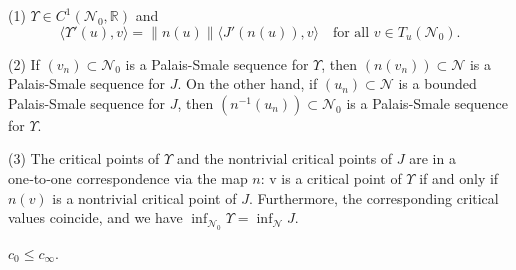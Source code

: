 \documentclass[reqno]{amsart}
\begin{document}
\begin{lemma}\label{L3.10} 
(1) $\Upsilon\in C^{1}(\mathcal{N}_0,\mathbb{R})$ and
$$
\langle \Upsilon'(u),v \rangle =\|n(u)\| \langle J'(n(u)),v \rangle \quad \text{for all } v\in T_{u}(\mathcal{N}_0).
$$

(2) If $(v_{n})\subset\mathcal{N}_0$ is a Palais-Smale sequence for $\Upsilon$,
 then $(n(v_{n}))\subset\mathcal{N}$ is a Palais-Smale sequence for $J$. 
On the other hand, if $(u_{n})\subset\mathcal{N}$ is a bounded Palais-Smale sequence for $J$, 
then $(n^{-1}(u_{n}))\subset\mathcal{N}_0$ is a Palais-Smale sequence for $\Upsilon$.

(3) The critical points of $\Upsilon$ and the nontrivial critical points of $J$ are in a one‑to‑one 
correspondence via the map $n$: v is a critical point of $\Upsilon$ if and only if $n(v)$ is a 
nontrivial critical point of $J$. Furthermore, the corresponding critical values coincide, and we
 have $\inf_{\mathcal{N}_0}\Upsilon=\inf_{\mathcal{N}}J$.
\end{lemma}

\begin{lemma}\label{L3.11} 
$c_0\leq c_\infty$.
\end{lemma}
\end{document}
